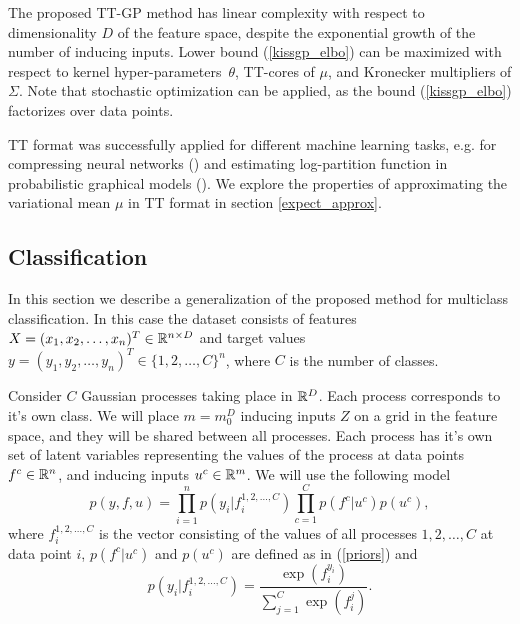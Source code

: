   The proposed TT-GP method has linear complexity with respect to dimensionality
  $D$ of the feature space, despite the exponential growth of the number of
  inducing inputs. Lower bound  (\ref{kissgp_elbo})
  can be maximized with respect to kernel hyper-parameters~$\theta$, TT-cores
  of $\mu$, and Kronecker multipliers of $\Sigma$. Note that stochastic optimization
  can be applied, as the bound (\ref{kissgp_elbo}) factorizes over data points.
  
  TT format was successfully applied for different machine learning tasks, 
  e.g. for compressing neural networks (\citet{novikov2015}) and
  estimating log-partition function in probabilistic graphical models 
  (\citet{novikov2014}). We explore the properties of approximating the 
  variational mean $\mu$ in TT format in section \ref{expect_approx}.



  \subsection{Classification}

  In this section we describe a generalization of the proposed method for
  multiclass classification. In this case the dataset consists of features
  $X = (x_1, x_2, \ldots, x_n)^T \in \mathbb{R}^{n \times D}$ and target values
  $y = (y_1, y_2, \ldots, y_n)^T \in \{1, 2, \ldots, C\}^n$, where $C$ is the
  number of classes.

  Consider $C$ Gaussian processes taking place in $\mathbb{R}^D$. Each process
  corresponds to it's own class. We will place $m = m_0^D$ inducing inputs $Z$ on a grid
  in the feature space, and they will be shared between all processes. Each
  process has it's own set of latent variables representing the values of
  the process at data points $f^c \in \mathbb{R}^n$, and inducing inputs $u^c \in \mathbb{R}^m$.
  We will use the following model
  \[
    p(y, f, u) = \prod_{i=1}^n p\left(y_i | f_i^{1, 2, \ldots, C}\right)
      \prod_{c=1}^C p\left(f^c | u^c\right) p(u^c),
  \]
  where $f_i^{1,2,\ldots,C}$ is the vector consisting of the values of all processes
  $1, 2, \ldots, C$ at data point $i$, $p(f^c | u^c)$ and $p(u^c)$ are defined 
  as in (\ref{priors}) and 
  \[
    p(y_i | f_i^{1,2, \ldots, C}) = 
    \frac {\exp(f_i^{y_i})} {\sum_{j=1}^C\exp(f_i^j)}.
  \]
  
